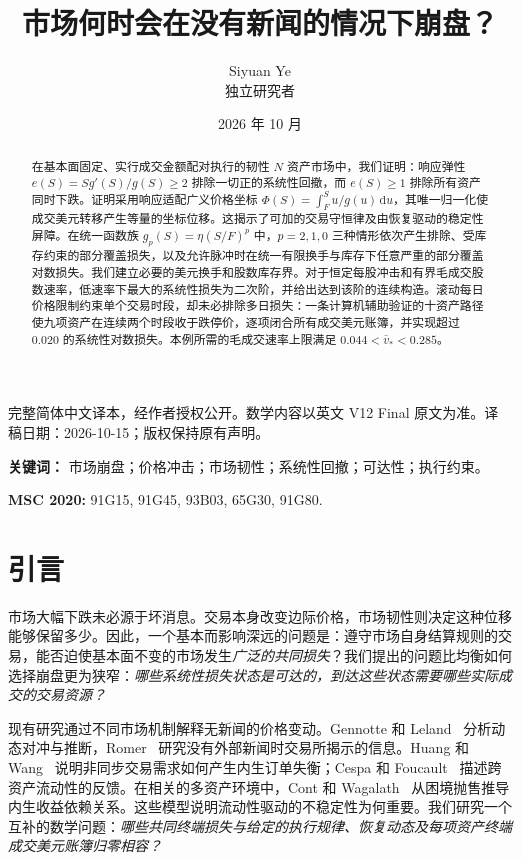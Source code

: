 \documentclass[11pt]{article}
\title{\textbf{市场何时会在没有新闻的情况下崩盘？}}
\author{Siyuan Ye\\{\small 独立研究者}}
\date{2026 年 10 月}
\numberwithin{equation}{section}
\theoremstyle{definition}
\theoremstyle{remark}
\begin{document}
\maketitle
\begin{center}\footnotesize 完整简体中文译本，经作者授权公开。数学内容以英文 V12 Final 原文为准。译稿日期：2026-10-15；版权保持原有声明。\end{center}
\vspace{-0.95em}
\begin{abstract}\noindent
在基本面固定、实行成交金额配对执行的韧性 $N$ 资产市场中，我们证明：响应弹性 $e(S)=Sg'(S)/g(S)\ge2$ 排除一切正的系统性回撤，而 $e(S)\ge1$ 排除所有资产同时下跌。证明采用响应适配广义价格坐标 $\Phi(S)=\int_F^S u/g(u)\,\mathrm{d}u$，其唯一归一化使成交美元转移产生等量的坐标位移。这揭示了可加的交易守恒律及由恢复驱动的稳定性屏障。在统一函数族 $g_p(S)=\eta(S/F)^p$ 中，$p=2,1,0$ 三种情形依次产生排除、受库存约束的部分覆盖损失，以及允许脉冲时在统一有限换手与库存下任意严重的部分覆盖对数损失。我们建立必要的美元换手和股数库存界。对于恒定每股冲击和有界毛成交股数速率，低速率下最大的系统性损失为二次阶，并给出达到该阶的连续构造。滚动每日价格限制约束单个交易时段，却未必排除多日损失：一条计算机辅助验证的十资产路径使九项资产在连续两个时段收于跌停价，逐项闭合所有成交美元账簿，并实现超过 $0.020$ 的系统性对数损失。本例所需的毛成交速率上限满足 $0.044<\bar v_*<0.285$。
\end{abstract}
\noindent\textbf{关键词：} 市场崩盘；价格冲击；市场韧性；系统性回撤；可达性；执行约束。\par
\noindent\textbf{MSC 2020:} 91G15, 91G45, 93B03, 65G30, 91G80.

\section{引言}\label{sec:intro}
市场大幅下跌未必源于坏消息。交易本身改变边际价格，市场韧性则决定这种位移能够保留多少。因此，一个基本而影响深远的问题是：遵守市场自身结算规则的交易，能否迫使基本面不变的市场发生\emph{广泛的共同损失}？我们提出的问题比均衡如何选择崩盘更为狭窄：\emph{哪些系统性损失状态是可达的，到达这些状态需要哪些实际成交的交易资源？}

现有研究通过不同市场机制解释无新闻的价格变动。Gennotte 和 Leland~\citep{GennotteLeland1990} 分析动态对冲与推断，Romer~\citep{Romer1993} 研究没有外部新闻时交易所揭示的信息。Huang 和 Wang~\citep{HuangWang2009} 说明非同步交易需求如何产生内生订单失衡；Cespa 和 Foucault~\citep{CespaFoucault2014} 描述跨资产流动性的反馈。在相关的多资产环境中，Cont 和 Wagalath~\citep{ContWagalath2013} 从困境抛售推导内生收益依赖关系。这些模型说明流动性驱动的不稳定性为何重要。我们研究一个互补的数学问题：\emph{哪些共同终端损失与给定的执行规律、恢复动态及每项资产终端成交美元账簿归零相容？}
\end{document}
